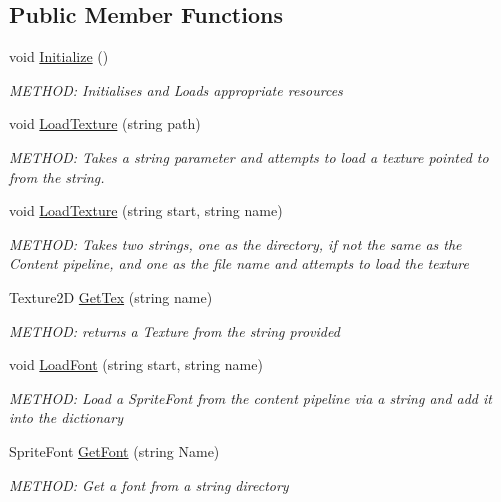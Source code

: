 \subsection*{Public Member Functions}
\begin{DoxyCompactItemize}
\item 
void \hyperlink{a00530_a77b00bda1dc37c9cabe2dbaf90655714}{Initialize} ()
\begin{DoxyCompactList}\small\item\em M\+E\+T\+H\+OD\+: Initialises and Loads appropriate resources \end{DoxyCompactList}\item 
void \hyperlink{a00530_aa767792c046f7e3e21c512de046dac81}{Load\+Texture} (string path)
\begin{DoxyCompactList}\small\item\em M\+E\+T\+H\+OD\+: Takes a string parameter and attempts to load a texture pointed to from the string. \end{DoxyCompactList}\item 
void \hyperlink{a00530_aed066679a7bd0ff5549d13323c88d4b4}{Load\+Texture} (string start, string name)
\begin{DoxyCompactList}\small\item\em M\+E\+T\+H\+OD\+: Takes two strings, one as the directory, if not the same as the Content pipeline, and one as the file name and attempts to load the texture \end{DoxyCompactList}\item 
Texture2D \hyperlink{a00530_a841de899c3601b3d35496ee798a6e894}{Get\+Tex} (string name)
\begin{DoxyCompactList}\small\item\em M\+E\+T\+H\+OD\+: returns a Texture from the string provided \end{DoxyCompactList}\item 
void \hyperlink{a00530_ab0e1965354b92f0fc2920c74b48a7f0d}{Load\+Font} (string start, string name)
\begin{DoxyCompactList}\small\item\em M\+E\+T\+H\+OD\+: Load a Sprite\+Font from the content pipeline via a string and add it into the dictionary \end{DoxyCompactList}\item 
Sprite\+Font \hyperlink{a00530_a160f06963928da598da9f9431ba65f73}{Get\+Font} (string Name)
\begin{DoxyCompactList}\small\item\em M\+E\+T\+H\+OD\+: Get a font from a string directory \end{DoxyCompactList}\item 

\end{DoxyCompactItemize}

